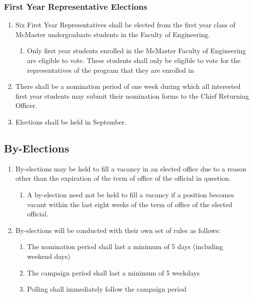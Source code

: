 \subsubsection{First Year Representative Elections}
\label{first-year-representative-elections}
\begin{enumerate}
 \item
  Six First Year Representatives shall be elected from the first year
  class of McMaster undergraduate students in the Faculty of
  Engineering.

  \begin{enumerate}
   \item
    Only first year students enrolled in the McMaster Faculty of
    Engineering are eligible to vote. These students shall only be
    eligible to vote for the representatives of the program that they
    are enrolled in
  \end{enumerate}
 \item
  There shall be a nomination period of one week during which all
  interested first year students may submit their nomination forms to
  the Chief Returning Officer.
 \item
  Elections shall be held in September.
\end{enumerate}
\subsection{By-Elections}
\label{by-elections}


\begin{enumerate}
 \item
  By-elections may be held to fill a vacancy in an elected office due to
  a reason other than the expiration of the term of office of the
  official in question.

  \begin{enumerate}
   \item
    A by-election need not be held to fill a vacancy if a position
    becomes vacant within the last eight weeks of the term of office of
    the elected official.
  \end{enumerate}
 \item
  By-elections will be conducted with their own set of rules as follows:

  \begin{enumerate}
   \item
    The nomination period shall last a minimum of 5 days (including
    weekend days)
   \item
    The campaign period shall last a minimum of 5 weekdays
   \item
    Polling shall immediately follow the campaign period
  \end{enumerate}
\end{enumerate}

